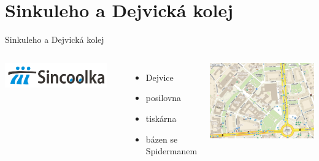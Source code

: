 \documentclass{beamer}
\begin{document}
\section{Sinkuleho a Dejvická kolej}
\begin{frame}{Sinkuleho a Dejvická kolej}
	\begin{columns}[c]
			\begin{center}
				\includegraphics[width=0.9\textwidth]{logo_sin.png}
			\end{center}

			\begin{itemize}
				\item Dejvice
				\item posilovna
				\item tiskárna
				\item bázen se Spidermanem
			\end{itemize}
			\begin{center}
				\includegraphics[width=\textwidth]{mapa_all.png}
			\end{center}
	\end{columns}
\end{frame}
\end{document}
